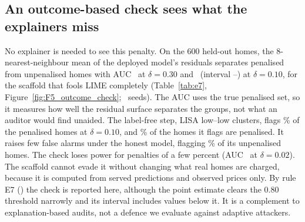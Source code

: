 \subsection{An outcome-based check sees what the explainers miss}
No explainer is needed to see this penalty. On the 600 held-out homes, the 8-nearest-neighbour mean of the
deployed model's residuals separates penalised from unpenalised homes with AUC \EsevenScaffoldAucLagThirty\ at
$\delta = 0.30$ and \EsevenAucLagScaffoldTen\ (interval \EsevenAucLagScaffoldTenLo--\EsevenAucLagScaffoldTenHi) at
$\delta = 0.10$, for the scaffold that fools LIME completely (Table~\ref{tab:e7}, Figure~\ref{fig:F5_outcome_check};
\EsevenSeeds\ seeds). The AUC uses the true penalised set, so it measures how well the residual surface separates the
groups, not what an auditor would find unaided. The label-free step, LISA low--low clusters, flags \EsevenRecallTen\%
of the penalised homes at $\delta = 0.10$, and \EsevenPrecTen\% of the homes it flags are penalised. It raises few
false alarms under the honest model, flagging \EsevenHonestFlag\% of its unpenalised homes. The check loses power for
penalties of a few percent (AUC \EsevenScaffoldAucLagTwo\ at $\delta = 0.02$). The scaffold cannot evade it without
changing what real homes are charged, because it is computed from served predictions and observed prices only. By rule
E7 (\RuleEsevenFeature) the check is reported here, although the point estimate clears the 0.80 threshold narrowly and
its interval includes values below it. It is a complement to explanation-based audits, not a defence we evaluate
against adaptive attackers.


